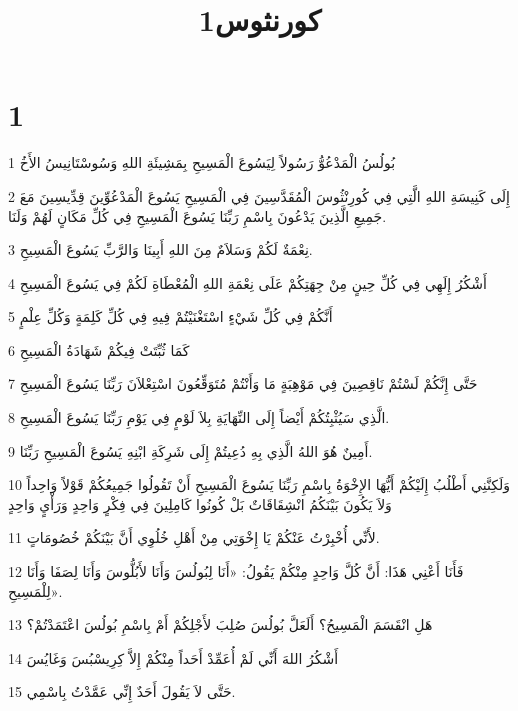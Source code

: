 

\title{1كورنثوس}


\chapter{1}

\par 1 بُولُسُ الْمَدْعُوُّ رَسُولاً لِيَسُوعَ الْمَسِيحِ بِمَشِيئَةِ اللهِ وَسُوسْتَانِيسُ الأَخُ
\par 2 إِلَى كَنِيسَةِ اللهِ الَّتِي فِي كُورِنْثُوسَ الْمُقَدَّسِينَ فِي الْمَسِيحِ يَسُوعَ الْمَدْعُوِّينَ قِدِّيسِينَ مَعَ جَمِيعِ الَّذِينَ يَدْعُونَ بِاسْمِ رَبِّنَا يَسُوعَ الْمَسِيحِ فِي كُلِّ مَكَانٍ لَهُمْ وَلَنَا.
\par 3 نِعْمَةٌ لَكُمْ وَسَلاَمٌ مِنَ اللهِ أَبِينَا وَالرَّبِّ يَسُوعَ الْمَسِيحِ.
\par 4 أَشْكُرُ إِلَهِي فِي كُلِّ حِينٍ مِنْ جِهَتِكُمْ عَلَى نِعْمَةِ اللهِ الْمُعْطَاةِ لَكُمْ فِي يَسُوعَ الْمَسِيحِ
\par 5 أَنَّكُمْ فِي كُلِّ شَيْءٍ اسْتَغْنَيْتُمْ فِيهِ فِي كُلِّ كَلِمَةٍ وَكُلِّ عِلْمٍ
\par 6 كَمَا ثُبِّتَتْ فِيكُمْ شَهَادَةُ الْمَسِيحِ
\par 7 حَتَّى إِنَّكُمْ لَسْتُمْ نَاقِصِينَ فِي مَوْهِبَةٍ مَا وَأَنْتُمْ مُتَوَقِّعُونَ اسْتِعْلاَنَ رَبِّنَا يَسُوعَ الْمَسِيحِ
\par 8 الَّذِي سَيُثْبِتُكُمْ أَيْضاً إِلَى النِّهَايَةِ بِلاَ لَوْمٍ فِي يَوْمِ رَبِّنَا يَسُوعَ الْمَسِيحِ.
\par 9 أَمِينٌ هُوَ اللهُ الَّذِي بِهِ دُعِيتُمْ إِلَى شَرِكَةِ ابْنِهِ يَسُوعَ الْمَسِيحِ رَبِّنَا.
\par 10 وَلَكِنَّنِي أَطْلُبُ إِلَيْكُمْ أَيُّهَا الإِخْوَةُ بِاسْمِ رَبِّنَا يَسُوعَ الْمَسِيحِ أَنْ تَقُولُوا جَمِيعُكُمْ قَوْلاً وَاحِداً وَلاَ يَكُونَ بَيْنَكُمُ انْشِقَاقَاتٌ بَلْ كُونُوا كَامِلِينَ فِي فِكْرٍ وَاحِدٍ وَرَأْيٍ وَاحِدٍ
\par 11 لأَنِّي أُخْبِرْتُ عَنْكُمْ يَا إِخْوَتِي مِنْ أَهْلِ خُلُوِي أَنَّ بَيْنَكُمْ خُصُومَاتٍ.
\par 12 فَأَنَا أَعْنِي هَذَا: أَنَّ كُلَّ وَاحِدٍ مِنْكُمْ يَقُولُ: «أَنَا لِبُولُسَ وَأَنَا لأَبُلُّوسَ وَأَنَا لِصَفَا وَأَنَا لِلْمَسِيحِ».
\par 13 هَلِ انْقَسَمَ الْمَسِيحُ؟ أَلَعَلَّ بُولُسَ صُلِبَ لأَجْلِكُمْ أَمْ بِاسْمِ بُولُسَ اعْتَمَدْتُمْ؟
\par 14 أَشْكُرُ اللهَ أَنِّي لَمْ أُعَمِّدْ أَحَداً مِنْكُمْ إِلاَّ كِرِيسْبُسَ وَغَايُسَ
\par 15 حَتَّى لاَ يَقُولَ أَحَدٌ إِنِّي عَمَّدْتُ بِاسْمِي.

